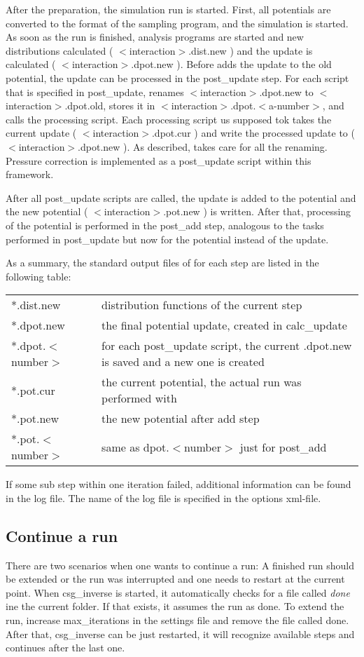 After the preparation, the simulation run is started. First, all potentials are converted to the format of the sampling program, and the simulation is started. As soon as the run is finished, analysis programs are started and new distributions calculated ( $<$interaction$>$.dist.new ) and the update is calculated ( $<$interaction$>$.dpot.new ). Before \votca adds the update to the old potential, the update can be processed in the post\_update step. For each script that is specified in post\_update, \votca renames $<$interaction$>$.dpot.new to $<$interaction$>$.dpot.old, stores it in $<$interaction$>$.dpot.$<$a-number$>$, and calls the processing script. Each processing script us supposed tok takes the current update ( $<$interaction$>$.dpot.cur ) and write the processed update to ( $<$interaction$>$.dpot.new ). As described, \votca takes care for all the renaming. Pressure correction is implemented as a post\_update script within this framework.

After all post\_update scripts are called, the update is added to the potential and the new potential ( $<$interaction$>$.pot.new ) is written. After that, processing of the potential is performed in the post\_add step, analogous to the tasks performed in post\_update but now for the potential instead of the update.

As a summary, the standard output files of \votca for each step are listed in the following table:

\begin{tabular}{ll}
*.dist.new & distribution functions of the current step \\
*.dpot.new & the final potential update, created in calc\_update \\
*.dpot.$<$number$>$ & for each post\_update script, the current .dpot.new is saved and a new one is created\\
*.pot.cur & the current potential, the actual run was performed with \\
*.pot.new & the new potential after add step \\
*.pot.$<$number$>$ & same as dpot.$<$number$>$ just for post\_add
\end{tabular}

If some sub step within one iteration failed, additional information can be found in the log file. The name of the log file is specified in the options xml-file.

\subsection{Continue a run}
There are two scenarios when one wants to continue a run: A finished run should be extended or the run was interrupted and one needs to restart at the current point. When csg\_inverse is started, it automatically checks for a file called \textit{done} ine the current folder. If that exists, it assumes the run as done. To extend the run, increase max\_iterations in the settings file and remove the file called done. After that, csg\_inverse can be just restarted, it will recognize available steps and continues after the last one.

